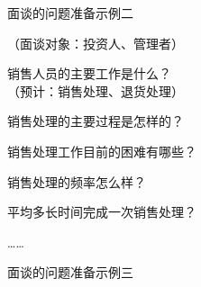 面谈的问题准备示例二

{\kaishu
（面谈对象：投资人、管理者）
\vspace{-0.25em}
\begin{compactenum}[1.]
    \item 销售人员的主要工作是什么？\\
    （预计：销售处理、退货处理）
    \item 销售处理的主要过程是怎样的？
    \item 销售处理工作目前的困难有哪些？
    \item 销售处理的频率怎么样？
    \item 平均多长时间完成一次销售处理？
\end{compactenum}
\vspace{-0.5em}
……}

面谈的问题准备示例三
\vspace{-0.8em}
